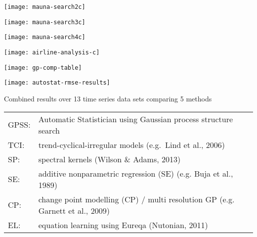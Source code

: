 
\centerline{\texttt{[image: mauna-search2c]}}


\centerline{\texttt{[image: mauna-search3c]}}


\centerline{\texttt{[image: mauna-search4c]}}


\texttt{[image: airline-analysis-c]} 





\centerline{\texttt{[image: gp-comp-table]}}


\centerline{\texttt{[image: autostat-rmse-results]}}

Combined results over 13 time series data sets comparing 5 methods\\

{\small
\begin{tabular}{ll}
GPSS: & Automatic Statistician using Gaussian process structure search\\
TCI: & trend-cyclical-irregular models (e.g.\ Lind et al., 2006) \\
SP: & spectral kernels (Wilson \& Adams, 2013) \\
SE: & additive nonparametric regression (SE) (e.g. Buja et al.,
1989)\\ 
CP: & change point modelling (CP) / multi resolution GP
(e.g. Garnett et al., 2009) \\
EL: & equation learning  using Eureqa (Nutonian, 2011) \\
\end{tabular}
}


